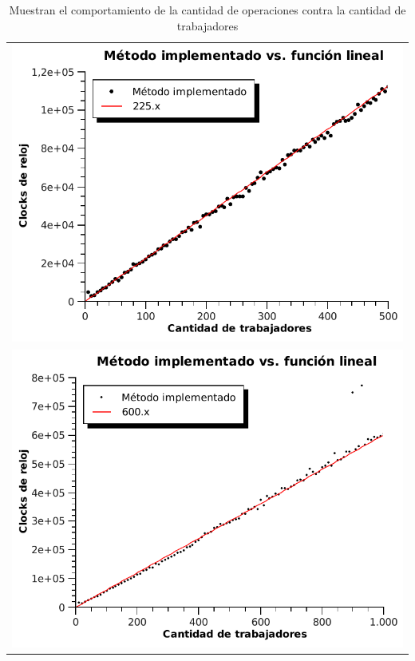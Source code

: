 \begin{table}[ht] %
\centering %
\begin{tabular}{c}
\includegraphics[scale=0.7]{../ej3/graficos/clocks1.pdf} \\
\includegraphics[scale=0.7]{../ej3/graficos/clocks5.pdf}
\end{tabular}

\caption{Muestran el comportamiento de la cantidad de operaciones contra la cantidad de trabajadores} %
\label{cantOp} %
\end{table}

